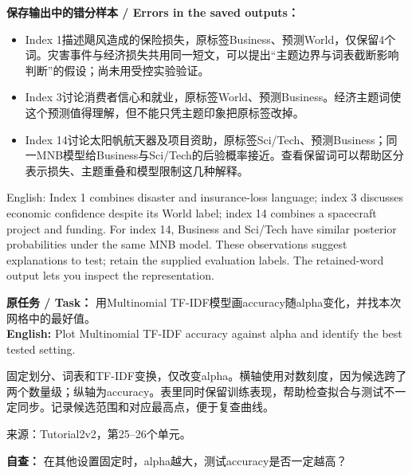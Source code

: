 \textbf{保存输出中的错分样本 / Errors in the saved outputs：}
\begin{itemize}
\item Index 1描述飓风造成的保险损失，原标签Business、预测World，仅保留4个词。灾害事件与经济损失共用同一短文，可以提出“主题边界与词表截断影响判断”的假设；尚未用受控实验验证。
\item Index 3讨论消费者信心和就业，原标签World、预测Business。经济主题词使这个预测值得理解，但不能只凭主题印象把原标签改掉。
\item Index 14讨论太阳帆航天器及项目资助，原标签Sci/Tech、预测Business；同一MNB模型给Business与Sci/Tech的后验概率接近。查看保留词可以帮助区分表示损失、主题重叠和模型限制这几种解释。
\end{itemize}


English: Index 1 combines disaster and insurance-loss language; index 3 discusses economic confidence despite its World label; index 14 combines a spacecraft project and funding. For index 14, Business and Sci/Tech have similar posterior probabilities under the same MNB model. These observations suggest explanations to test; retain the supplied evaluation labels. The retained-word output lets you inspect the representation.







\textbf{原任务 / Task：} 用Multinomial TF-IDF模型画accuracy随alpha变化，并找本次网格中的最好值。\\

\textbf{English:} Plot Multinomial TF-IDF accuracy against alpha and identify the best tested setting.


固定划分、词表和TF-IDF变换，仅改变alpha。横轴使用对数刻度，因为候选跨了两个数量级；纵轴为accuracy。表里同时保留训练表现，帮助检查拟合与测试不一定同步。记录候选范围和对应最高点，便于复查曲线。


来源：Tutorial2v2，第25–26个单元。








\textbf{自查：} 在其他设置固定时，alpha越大，测试accuracy是否一定越高？\\

